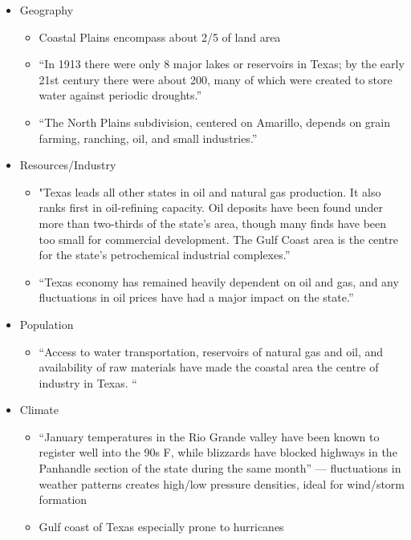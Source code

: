 \documentclass[9pt,twocolumn,twoside]{pnas-new}
\begin{document}
\begin{itemize}
\item Geography
\begin{itemize}
\item Coastal Plains encompass about 2/5 of land area
\item “In 1913 there were only 8 major lakes or reservoirs in Texas; by the early 21st century there were about 200, many of which were created to store water against periodic droughts.”
\item “The North Plains subdivision, centered on Amarillo, depends on grain farming, ranching, oil, and small industries.”
\end{itemize}

\item Resources/Industry
\begin{itemize}
\item "Texas leads all other states in oil and natural gas production. It also ranks first in oil-refining capacity. Oil deposits have been found under more than two-thirds of the state’s area, though many finds have been too small for commercial development. The Gulf Coast area is the centre for the state’s petrochemical industrial complexes.”
\item “Texas economy has remained heavily dependent on oil and gas, and any fluctuations in oil prices have had a major impact on the state.”
\end{itemize}

\item Population
\begin{itemize}
\item “Access to water transportation, reservoirs of natural gas and oil, and availability of raw materials have made the coastal area the centre of industry in Texas. “

\end{itemize}

\item Climate
\begin{itemize}
\item “January temperatures in the Rio Grande valley have been known to register well into the 90s F, while blizzards have blocked highways in the Panhandle section of the state during the same month” — fluctuations in weather patterns creates high/low pressure densities, ideal for wind/storm formation
\item Gulf coast of Texas especially prone to hurricanes
\end{itemize}


\end{itemize}
\end{document}
